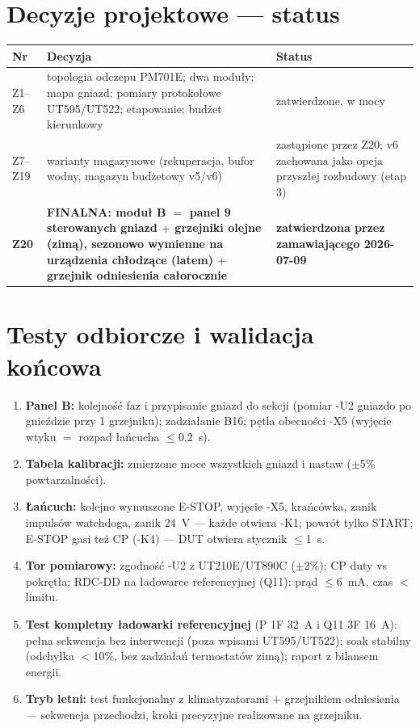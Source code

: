 \documentclass[11pt,a4paper]{article}
\begin{document}
\section{Decyzje projektowe --- status}
\begin{longtable}{@{}p{}p{}p{}@{}}
\toprule
\textbf{Nr} & \textbf{Decyzja} & \textbf{Status}\\
\midrule
Z1--Z6 & topologia odczepu PM701E; dwa moduły; mapa gniazd; pomiary protokołowe UT595/UT522;
etapowanie; budżet kierunkowy & zatwierdzone, w mocy\\
Z7--Z19 & warianty magazynowe (rekuperacja, bufor wodny, magazyn budżetowy v5/v6) & zastąpione
przez Z20; v6 zachowana jako opcja przyszłej rozbudowy (etap 3)\\
\textbf{Z20} & \textbf{FINALNA: moduł B $=$ panel 9 sterowanych gniazd $+$ grzejniki olejne
(zimą), sezonowo wymienne na urządzenia chłodzące (latem) $+$ grzejnik odniesienia całorocznie}
& \textbf{zatwierdzona przez zamawiającego 2026-07-09}\\
\bottomrule
\end{longtable}

\section{Testy odbiorcze i walidacja końcowa}
\begin{enumerate}
\item \textbf{Panel B:} kolejność faz i przypisanie gniazd do sekcji (pomiar -U2 gniazdo po
gnieździe przy 1 grzejniku); zadziałanie B16; pętla obecności -X5 (wyjęcie wtyku $=$ rozpad
łańcucha $\le$0,2~s).
\item \textbf{Tabela kalibracji:} zmierzone moce wszystkich gniazd i nastaw ($\pm$5\% powtarzalności).
\item \textbf{Łańcuch:} kolejno wymuszone E-STOP, wyjęcie -X5, krańcówka, zanik impulsów
watchdoga, zanik 24~V --- każde otwiera -K1; powrót tylko START; E-STOP gasi też CP (-K4) ---
DUT otwiera stycznik $\le$1~s.
\item \textbf{Tor pomiarowy:} zgodność -U2 z UT210E/UT890C ($\pm$2\%); CP duty vs pokrętła;
RDC-DD na ładowarce referencyjnej (Q11): prąd $\le$6~mA, czas $<$ limitu.
\item \textbf{Test kompletny ładowarki referencyjnej} (P 1F 32~A i Q11 3F 16~A): pełna sekwencja
bez interwencji (poza wpisami UT595/UT522); soak stabilny (odchyłka $<$10\%, bez zadziałań
termostatów zimą); raport z bilansem energii.
\item \textbf{Tryb letni:} test funkcjonalny z klimatyzatorami $+$ grzejnikiem odniesienia ---
sekwencja przechodzi, kroki precyzyjne realizowane na grzejniku.
\end{enumerate}
\end{document}
